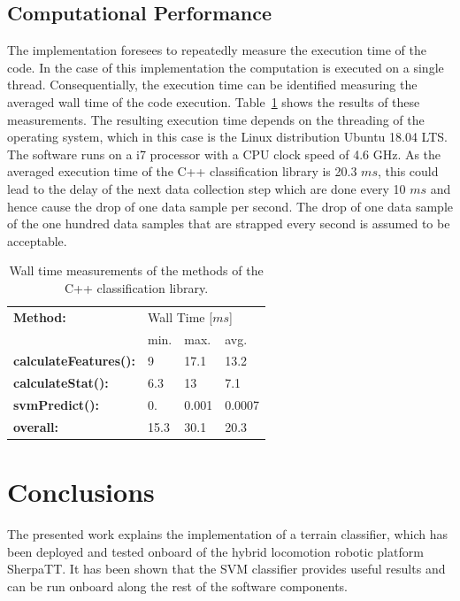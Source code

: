 \documentclass{article}
\begin{document}
\subsection{Computational Performance}
The implementation foresees to repeatedly measure the execution time of the code. In the case of this implementation the computation is executed on a single thread. Consequentially, the execution time can be identified measuring the averaged wall time of the code execution. Table~\ref{table:compmeasurments} shows the results of these measurements. The resulting execution time depends on the threading of the operating system, which in this case is the Linux distribution Ubuntu 18.04 LTS. The software runs on a i7 processor with a CPU clock speed of 4.6 GHz. As the averaged execution time of the C++ classification library is 20.3 $ms$, this could lead to the delay of the next data collection step which are done every 10 $ms$ and hence cause the drop of one data sample per second. The drop of one data sample of the one hundred data samples that are strapped every second is assumed to be acceptable.

\begin{table}[htb!]
   \centering
    \caption{Wall time measurements of the methods of the C++ classification library.}
    \begin{tabularx}{\columnwidth}{X|XXX}
        \textbf{Method:} & \multicolumn{3}{X}{Wall Time [$ms$]} \\
        &min.&max.&avg.\\
        \hline
        \hline
        \textbf{calculateFeatures():} & 9&  17.1& 13.2 \\
        \textbf{calculateStat():}     & 6.3 & 13 & 7.1 \\
        \textbf{svmPredict():}        &  0. &  0.001 & 0.0007  \\
        \hline
        \textbf{overall:}             & 15.3 & 30.1 &20.3  \\
    \end{tabularx}	
    \label{table:compmeasurments}
\end{table}


\section{Conclusions}

The presented work explains the implementation of a terrain classifier, which has been deployed and tested onboard of the hybrid locomotion robotic platform SherpaTT.
It has been shown that the SVM classifier provides useful results and can be run onboard along the rest of the software components.
\end{document}
